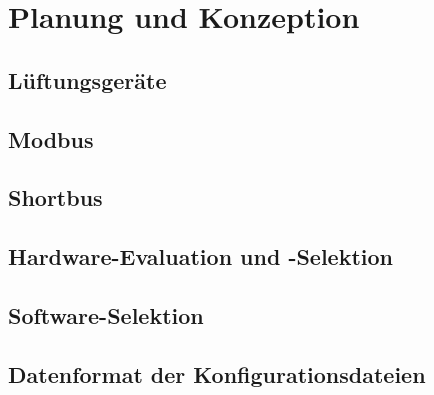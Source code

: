 \ifoot{\fenkart}
\chapter{Planung und Konzeption}
\section{Lüftungsgeräte}


\newpage
\ifoot{\schneider}
\section{Modbus}


\newpage
\ifoot{\fenkart}
\section{Shortbus} \label{shortbus_chapter}


\newpage
\ifoot{\mangeng}
\section{Hardware-Evaluation und -Selektion}



\newpage
\ifoot{\schneider}
\section{Software-Selektion}



\newpage
\ifoot{\pezze}


\newpage
\ifoot{\pezze}
\section{Datenformat der Konfigurationsdateien}

